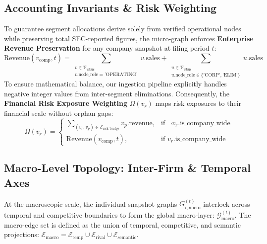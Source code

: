 \subsection{Accounting Invariants \& Risk Weighting}
To guarantee segment allocations derive solely from verified operational nodes while preserving total SEC-reported figures, the micro-graph enforces \textbf{Enterprise Revenue Preservation} for any company snapshot at filing period $t$:
\begin{equation}
    \text{Revenue}(v_{\text{comp}}, t) = \sum_{\substack{v \in \mathcal{V}_{\text{wbus}} \\ v.\text{node\_role} = \text{'OPERATING'}}} v.\text{sales} + \sum_{\substack{u \in \mathcal{V}_{\text{wbus}} \\ u.\text{node\_role} \in \{\text{'CORP'}, \text{'ELIM'}\}}} u.\text{sales}
\end{equation}
To ensure mathematical balance, our ingestion pipeline explicitly handles negative integer values from inter-segment eliminations. Consequently, the \textbf{Financial Risk Exposure Weighting} $\Omega(v_r)$ maps risk exposures to their financial scale without orphan gaps:
\begin{equation}
    \Omega(v_r) = \begin{cases} 
        \sum_{(v_r, v_p) \in \mathcal{E}_{\text{risk\_bridge}}} v_p.\text{revenue}, & \text{if } \neg v_r.\text{is\_company\_wide} \\ 
        \text{Revenue}(v_{\text{comp}}, t), & \text{if } v_r.\text{is\_company\_wide} 
    \end{cases}
\end{equation}

\subsection{Macro-Level Topology: Inter-Firm \& Temporal Axes}
At the macroscopic scale, the individual snapshot graphs $G_{i,\text{micro}}^{(t)}$ interlock across temporal and competitive boundaries to form the global macro-layer: $\mathcal{G}_{\text{macro}}^{(t)}$. The macro-edge set is defined as the union of temporal, competitive, and semantic projections: $\mathcal{E}_{\text{macro}} = \mathcal{E}_{\text{temp}} \cup \mathcal{E}_{\text{rival}} \cup \mathcal{E}_{\text{semantic}}$.

